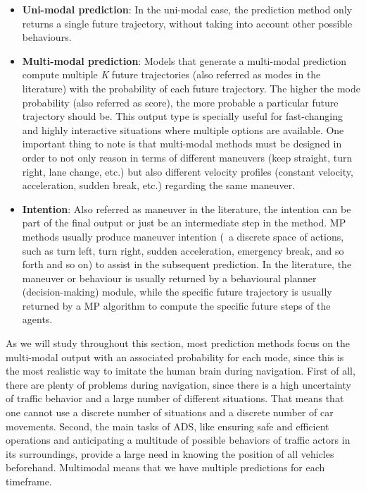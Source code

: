 \begin{itemize}
	
	\item \textbf{Uni-modal prediction}: In the uni-modal case, the prediction method only returns a single future trajectory, without taking into account other possible behaviours. 
	
	\item \textbf{Multi-modal prediction}: Models that generate a multi-modal prediction compute multiple \textit{K} future trajectories (also referred as modes in the literature) with the probability of each future trajectory. The higher the mode probability (also referred as score), the more probable a particular future trajectory should be. This output type is specially useful for fast-changing and highly interactive situations where multiple options are available. One important thing to note is that multi-modal methods must be designed in order to not only reason in terms of different maneuvers (keep straight, turn right, lane change, etc.) but also different velocity profiles (constant velocity, acceleration, sudden break, etc.) regarding the same maneuver.
	
	\item \textbf{Intention}: Also referred as maneuver in the literature, the intention can be part of the final output or just be an intermediate step in the method. \ac{MP} methods usually produce maneuver intention (\ie \ a discrete space of actions, such as turn left, turn right, sudden acceleration, emergency break, and so forth and so on) to assist in the subsequent prediction. In the literature, the maneuver or behaviour is usually returned by a behavioural planner (decision-making) module, while the specific future trajectory is usually returned by a \ac{MP} algorithm to compute the specific future steps of the agents.
\end{itemize}

As we will study throughout this section, most prediction methods focus on the multi-modal output with an associated probability for each mode, since this is the most realistic way to imitate the human brain during navigation. First of all, there are plenty of problems during navigation, since there is a high uncertainty of traffic behavior and a large number of different situations. That means that one cannot use a discrete number of situations and a discrete number of car movements. Second, the main tasks of \ac{ADS}, like ensuring safe and efficient operations and anticipating a multitude of possible behaviors of traffic actors in its surroundings, provide a large need in knowing the position of all vehicles beforehand. Multimodal means that we have multiple predictions for each timeframe. 

